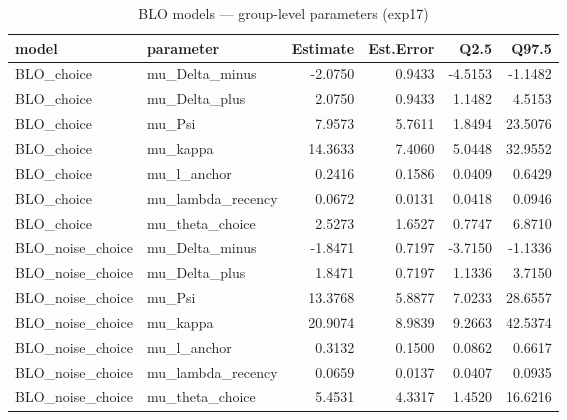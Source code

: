 \begin{table}

\caption{BLO models — group-level parameters (exp17)}
\centering
\begin{tabular}[t]{llrrrr}
\toprule
model & parameter & Estimate & Est.Error & Q2.5 & Q97.5\\
\midrule
BLO\_choice & mu\_Delta\_minus & -2.0750 & 0.9433 & -4.5153 & -1.1482\\
BLO\_choice & mu\_Delta\_plus & 2.0750 & 0.9433 & 1.1482 & 4.5153\\
BLO\_choice & mu\_Psi & 7.9573 & 5.7611 & 1.8494 & 23.5076\\
BLO\_choice & mu\_kappa & 14.3633 & 7.4060 & 5.0448 & 32.9552\\
BLO\_choice & mu\_l\_anchor & 0.2416 & 0.1586 & 0.0409 & 0.6429\\
\addlinespace
BLO\_choice & mu\_lambda\_recency & 0.0672 & 0.0131 & 0.0418 & 0.0946\\
BLO\_choice & mu\_theta\_choice & 2.5273 & 1.6527 & 0.7747 & 6.8710\\
BLO\_noise\_choice & mu\_Delta\_minus & -1.8471 & 0.7197 & -3.7150 & -1.1336\\
BLO\_noise\_choice & mu\_Delta\_plus & 1.8471 & 0.7197 & 1.1336 & 3.7150\\
BLO\_noise\_choice & mu\_Psi & 13.3768 & 5.8877 & 7.0233 & 28.6557\\
\addlinespace
BLO\_noise\_choice & mu\_kappa & 20.9074 & 8.9839 & 9.2663 & 42.5374\\
BLO\_noise\_choice & mu\_l\_anchor & 0.3132 & 0.1500 & 0.0862 & 0.6617\\
BLO\_noise\_choice & mu\_lambda\_recency & 0.0659 & 0.0137 & 0.0407 & 0.0935\\
BLO\_noise\_choice & mu\_theta\_choice & 5.4531 & 4.3317 & 1.4520 & 16.6216\\
\bottomrule
\end{tabular}
\end{table}
